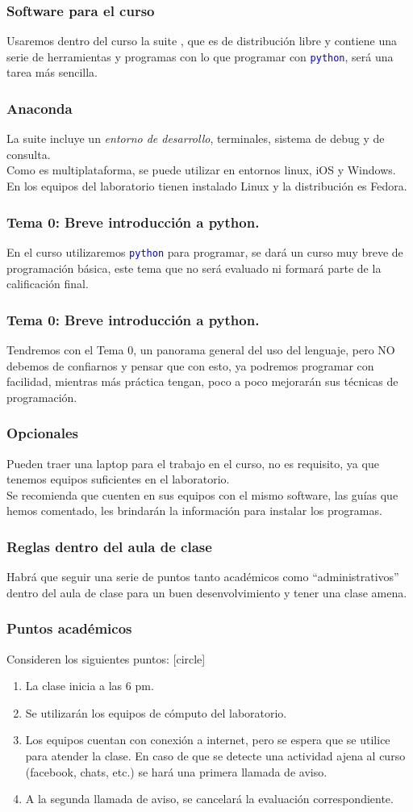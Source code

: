 \begin{frame}
\frametitle{Software para el curso}
Usaremos dentro del curso la suite , que es de distribución libre y contiene una serie de herramientas y programas con lo que programar con \textcolor{blue}{\texttt{python}}, será una tarea más sencilla.
\end{frame}
\begin{frame}
\frametitle{Anaconda}
La suite incluye un \emph{entorno de desarrollo}, terminales, sistema de debug y de consulta.
\\
\bigskip
Como es multiplataforma, se puede utilizar en entornos linux, iOS y Windows. En los equipos del laboratorio tienen instalado Linux y la distribución es Fedora.
\end{frame}
\begin{frame}
\frametitle{Tema 0: Breve introducción a python.}
En el curso utilizaremos \textcolor{blue}{\texttt{python}} para programar, se dará un curso muy breve de programación básica, este tema que no será evaluado ni formará parte de la calificación final.
\end{frame}
\begin{frame}
\frametitle{Tema 0: Breve introducción a python.}
Tendremos con el Tema 0, un panorama general del uso del lenguaje, pero NO debemos de confiarnos y pensar que con esto, ya podremos programar con facilidad, mientras más práctica tengan, poco a poco mejorarán sus técnicas de programación.
\end{frame}
\begin{frame}
\frametitle{Opcionales}
Pueden traer una laptop para el trabajo en el curso, no es requisito, ya que tenemos equipos suficientes en el laboratorio.
\\
\medskip
Se recomienda que cuenten en sus equipos con el mismo software, las guías que hemos comentado, les brindarán la información para instalar los programas.
\end{frame}
\begin{frame}
\frametitle{Reglas dentro del aula de clase}
Habrá que seguir una serie de puntos tanto académicos como \enquote{administrativos} dentro del aula de clase para un buen desenvolvimiento y tener una clase amena. 
\end{frame}
\begin{frame}
\frametitle{Puntos académicos}
Consideren los siguientes puntos:
[circle]
\begin{enumerate}[<+->]
\item La clase inicia a las 6 pm.
\item Se utilizarán los equipos de cómputo del laboratorio.
\item Los equipos cuentan con conexión a internet, pero se espera que se utilice para atender la clase. En caso de que se detecte una actividad ajena al curso (facebook, chats, etc.) se hará una primera llamada de aviso.
\item A la segunda llamada de aviso, se cancelará la evaluación correspondiente.
\end{enumerate}
\end{frame}
